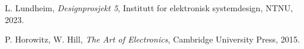
  L. Lundheim,
  \emph{Designprosjekt 5},
  Institutt for elektronisk systemdesign,
  NTNU,
  2023.

  P. Horowitz, W. Hill,
  \emph{The Art of Electronics},
  Cambridge University Press,
  2015.

